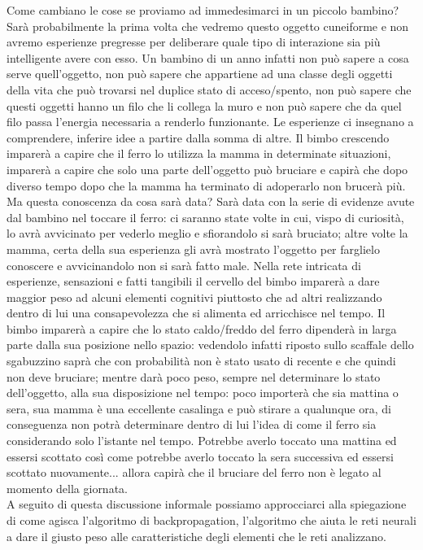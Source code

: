 Come cambiano le cose se proviamo ad immedesimarci in un piccolo bambino? Sarà probabilmente la prima volta che vedremo questo oggetto cuneiforme e non avremo esperienze pregresse per deliberare quale tipo di interazione sia più intelligente avere con esso. Un bambino di un anno infatti non può sapere a cosa serve quell'oggetto, non può sapere che appartiene ad una classe degli oggetti della vita che può trovarsi nel duplice stato di acceso/spento, non può sapere che questi oggetti hanno un filo che li collega la muro e non può sapere che da quel filo passa l'energia necessaria a renderlo funzionante. Le esperienze ci insegnano a comprendere, inferire idee a partire dalla somma di altre. Il bimbo crescendo imparerà a capire che il ferro lo utilizza la mamma in determinate situazioni, imparerà a capire che solo una parte dell'oggetto può bruciare e capirà che dopo diverso tempo dopo che la mamma ha terminato di adoperarlo non brucerà più. Ma questa conoscenza da cosa sarà data? Sarà data con la serie di evidenze avute dal bambino nel toccare il ferro: ci saranno state volte in cui, vispo di curiosità, lo avrà avvicinato per vederlo meglio e sfiorandolo si sarà bruciato; altre volte la mamma, certa della sua esperienza gli avrà mostrato l'oggetto per farglielo conoscere e avvicinandolo non si sarà fatto male. Nella rete intricata di esperienze, sensazioni e fatti tangibili il cervello del bimbo imparerà a dare maggior peso ad alcuni elementi cognitivi piuttosto che ad altri realizzando dentro di lui una consapevolezza che si alimenta ed arricchisce nel tempo. Il bimbo imparerà a capire che lo stato caldo/freddo del ferro dipenderà in larga parte dalla sua posizione nello spazio: vedendolo infatti riposto sullo scaffale dello sgabuzzino saprà che con probabilità non è stato usato di recente e che quindi non deve bruciare; mentre darà poco peso, sempre nel determinare lo stato dell'oggetto, alla sua disposizione nel tempo: poco importerà che sia mattina o sera, sua mamma è una eccellente casalinga e può stirare a qualunque ora, di conseguenza non potrà determinare dentro di lui l'idea di come il ferro sia considerando solo l'istante nel tempo. Potrebbe averlo toccato una mattina ed essersi scottato così come potrebbe averlo toccato la sera successiva ed essersi scottato nuovamente... allora capirà che il bruciare del ferro non è legato al momento della giornata. 
\\
A seguito di questa discussione informale possiamo approcciarci alla spiegazione di come agisca l'algoritmo di backpropagation, l'algoritmo che aiuta le reti neurali a dare il giusto peso alle caratteristiche degli elementi che le reti analizzano. 
